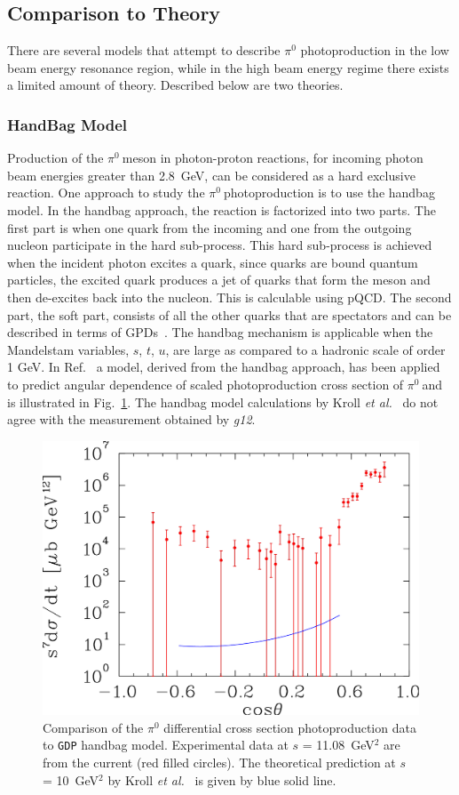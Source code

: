 \documentclass{aip-cp}
\def\g12{\emph{g12}}
\newcommand{\abbr}[1]{\textsc{\texttt{#1}}}
\def\piz{$\pi^{0}\ $}
\begin{document}
\subsection{Comparison to Theory}
There are several models that attempt to describe  $\pi^0$ photoproduction in the low beam energy resonance region, while in the high beam energy regime there exists a limited amount of theory. Described below are two theories. 
\subsubsection{HandBag Model}
Production of the \piz meson in photon-proton reactions, for incoming photon beam energies greater than 2.8~GeV, can be considered as a hard exclusive reaction. One approach to study the \piz photoproduction is to use the handbag model. In the handbag approach, the reaction is factorized into two parts. The first part is when one quark from the incoming and one from the outgoing nucleon participate in the hard sub-process. This hard sub-process is achieved when the incident photon excites a quark, since quarks are bound quantum particles, the excited quark produces a jet of quarks that form the meson and then de-excites back into the nucleon. This is calculable using pQCD. The second part, the soft part, consists of all the other quarks that are spectators and can be described in terms of GPDs~\cite{key1, key2,Rad1996, Diehl}. The handbag mechanism is applicable when the Mandelstam variables, $s$, $t$, $u$, are large as compared to a hadronic scale of order 1 GeV. In Ref.~\cite{Huang2000} a model, derived from the handbag approach, has been applied to predict angular dependence of scaled photoproduction cross section of \piz and is illustrated in Fig.~\ref{fig:pi0_handbag}. The handbag model calculations by Kroll \textit{et al.}~\cite{Huang2000} do not agree with the measurement obtained by \g12.
\begin{figure}[h]
	\centerline{\includegraphics[width=200 pt]{figures/kroll-eps-converted-to.pdf}}
	\caption{Comparison of the $\pi^0$ differential cross section  photoproduction data to \abbr{GDP} handbag model. Experimental data at $s$ = 11.08~GeV$^2$ are from the current (red filled circles). The theoretical prediction at $s$ = 10~GeV$^2$ by Kroll \textit{et al.}~\protect\cite{Huang2000} is given by blue solid line.}
	\label{fig:pi0_handbag}
\end{figure}
\end{document}
